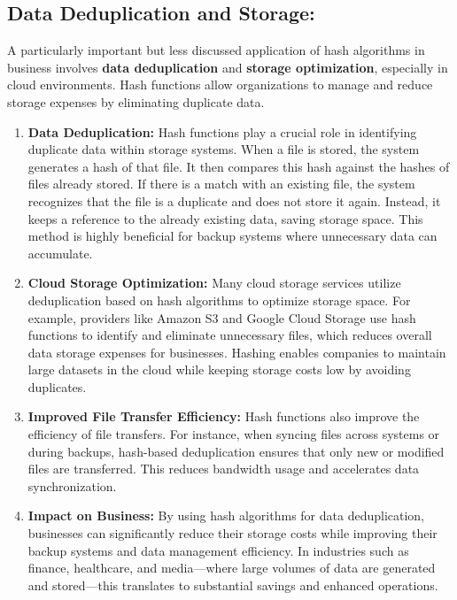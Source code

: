 \documentclass[11pt,a4paper]{article}
\begin{document}
    \subsection*{Data Deduplication and Storage:}
    A particularly important but less discussed application of hash algorithms in business involves \textbf{data deduplication} and \textbf{storage optimization}, especially in cloud environments. Hash functions allow organizations to manage and reduce storage expenses by eliminating duplicate data.

    \begin{enumerate}
        \item \textbf{Data Deduplication:}
        \newline
        Hash functions play a crucial role in identifying duplicate data within storage systems. When a file is stored, the system generates a hash of that file. It then compares this hash against the hashes of files already stored. If there is a match with an existing file, the system recognizes that the file is a duplicate and does not store it again. Instead, it keeps a reference to the already existing data, saving storage space. This method is highly beneficial for backup systems where unnecessary data can accumulate.

        \item \textbf{Cloud Storage Optimization:}
        \newline
        Many cloud storage services utilize deduplication based on hash algorithms to optimize storage space. For example, providers like Amazon S3 and Google Cloud Storage use hash functions to identify and eliminate unnecessary files, which reduces overall data storage expenses for businesses. Hashing enables companies to maintain large datasets in the cloud while keeping storage costs low by avoiding duplicates.

        \item \textbf{Improved File Transfer Efficiency:}
        \newline
        Hash functions also improve the efficiency of file transfers. For instance, when syncing files across systems or during backups, hash-based deduplication ensures that only new or modified files are transferred. This reduces bandwidth usage and accelerates data synchronization.

        \item \textbf{Impact on Business:}
        \newline
        By using hash algorithms for data deduplication, businesses can significantly reduce their storage costs while improving their backup systems and data management efficiency. In industries such as finance, healthcare, and media—where large volumes of data are generated and stored—this translates to substantial savings and enhanced operations.

    \end{enumerate}
\end{document}
